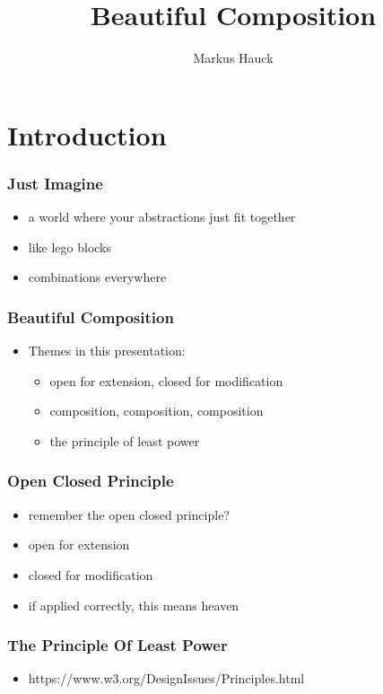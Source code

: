 \documentclass{beamer}
\title{Beautiful Composition}
\author{Markus Hauck}
\begin{document}
\begin{frame}
  \titlepage{}
\end{frame}

\section{Introduction}\label{sec:introduction}

\begin{frame}
  \frametitle{Just Imagine}
  \begin{itemize}
  \item a world where your abstractions just fit together
  \item like lego blocks
  \item combinations everywhere
  \end{itemize}
\end{frame}

\begin{frame}
  \frametitle{Beautiful Composition}
  \begin{itemize}
  \item Themes in this presentation:
    \begin{itemize}
    \item open for extension, closed for modification
    \item composition, composition, composition
    \item the principle of least power
    \end{itemize}
  \end{itemize}
\end{frame}

\begin{frame}
  \frametitle{Open Closed Principle}
  \begin{itemize}
  \item remember the open closed principle?
  \item open for extension
  \item closed for modification
  \item if applied correctly, this means heaven
  \end{itemize}
\end{frame}

\begin{frame}
  \frametitle{The Principle Of Least Power}
  \begin{itemize}
  \item https://www.w3.org/DesignIssues/Principles.html
  \end{itemize}
\end{frame}
\end{document}
